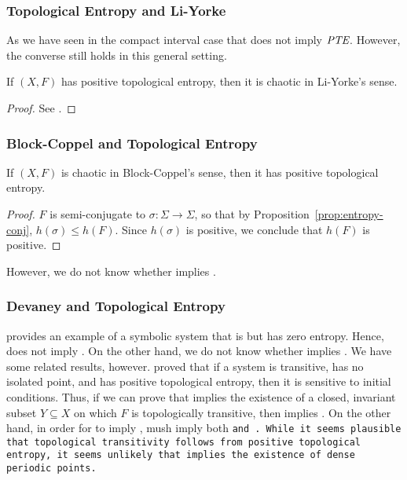 \documentclass[10pt,twoside,draft]{book}
\begin{document}
\subsubsection*{Topological Entropy and Li-Yorke}
As we have seen in the compact interval case that \liy does not imply $\emph{PTE}$.
However, the converse still holds in this general setting.
\begin{theorem}
  If $(X,F)$ has positive topological entropy, then it is chaotic in Li-Yorke's sense.
  \label{thm:entropy-liyorke}
  \begin{proof}
    See \citet{blanchard}.
  \end{proof}
\end{theorem}

\subsubsection*{Block-Coppel and Topological Entropy}
\begin{theorem}
  If $(X,F)$ is chaotic in Block-Coppel's sense, then it has positive topological entropy.
  \begin{proof}
    $F$ is semi-conjugate to $\sigma: \Sigma \to \Sigma$, so that by Proposition~\ref{prop:entropy-conj}, $h(\sigma) \leq h(F)$.
    Since $h(\sigma)$ is positive, we conclude that $h(F)$ is positive.
  \end{proof}
  \label{thm:blcp-entropy}
\end{theorem}
%
However, we do not know whether \pte implies \blcp.



\subsubsection*{Devaney and Topological Entropy}
\citet{glasner} provides an example of a symbolic system that is \dev but has zero entropy.
Hence, \dev does not imply \pte.
On the other hand, we do not know whether \pte implies \dev.
We have some related results, however.
\citet{glasner} proved that if a system is transitive, has no isolated point, and has positive topological entropy, then it is sensitive to initial conditions.
Thus, if we can prove that \pte implies the existence of a closed, invariant subset $Y \subseteq X$ on which $F$ is topologically transitive, then \pte implies \wig.
On the other hand, in order for \pte to imply \dev, \pte mush imply both \tt and \dpp.
While it seems plausible that topological transitivity follows from positive topological entropy, it seems unlikely that \pte implies the existence of dense periodic points.
\end{document}
